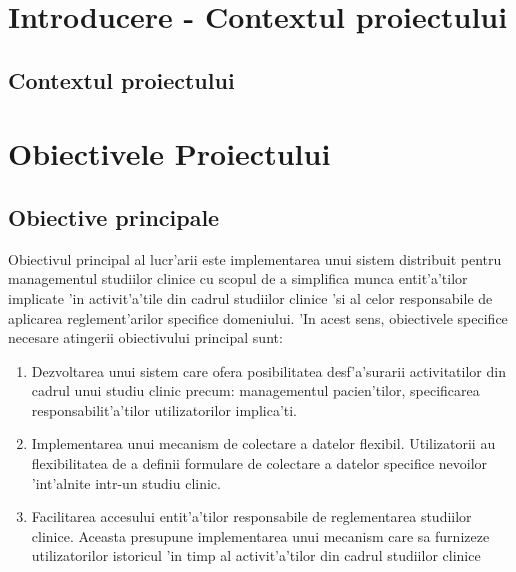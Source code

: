 \documentclass[12pt,a4paper,twoside]{report}
\begin{document}


 

\newpage

\tableofcontents
\newpage



\chapter{Introducere - Contextul proiectului}
\pagestyle{headings}

\section{Contextul proiectului}


\chapter{Obiectivele Proiectului}

\section{Obiective principale}

Obiectivul principal al lucr'arii este implementarea unui sistem distribuit pentru managementul studiilor clinice cu scopul de a simplifica munca entit'a'tilor implicate 'in activit'a'tile din cadrul studiilor clinice 'si al celor responsabile de aplicarea reglement'arilor specifice domeniului. 'In acest sens, obiectivele specifice necesare atingerii obiectivului principal sunt:
    \begin{enumerate}
        \item Dezvoltarea unui sistem care ofera posibilitatea desf'a'surarii activitatilor din cadrul unui studiu clinic precum: managementul pacien'tilor, specificarea responsabilit'a'tilor utilizatorilor implica'ti.
        \item Implementarea unui mecanism de colectare a datelor flexibil. Utilizatorii au flexibilitatea de a definii formulare de colectare a datelor specifice nevoilor 'int'alnite intr-un studiu clinic.
        \item Facilitarea accesului entit'a'tilor responsabile de reglementarea studiilor clinice. Aceasta presupune implementarea unui mecanism care sa furnizeze utilizatorilor istoricul 'in timp al activit'a'tilor din cadrul studiilor clinice
    \end{enumerate}
    
\end{document}
